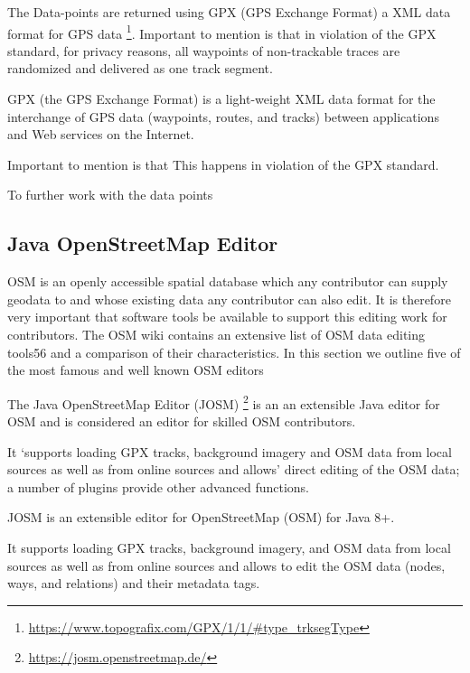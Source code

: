 The Data-points are returned using GPX (GPS Exchange Format) a XML data format for GPS data \footnote{\url{https://www.topografix.com/GPX/1/1/#type_trksegType}}. Important to mention is that in violation of the GPX standard, for privacy reasons, all waypoints of non-trackable traces are randomized and delivered as one track segment. 

GPX (the GPS Exchange Format) is a light-weight XML data format for the interchange of GPS data (waypoints, routes, and tracks) between applications and Web services on the Internet. 

Important to mention is that This happens in violation of the GPX standard. 

To further work with the data points 




\subsection{Java OpenStreetMap Editor}

OSM is an openly accessible spatial database which any contributor can supply geodata to and whose existing data any contributor can also edit. It is therefore very important that software tools be available to support this editing work for contributors. The OSM wiki contains an extensive list of OSM data editing tools56
and a comparison of their characteristics. In this section we outline five of the most famous and well known OSM editors

The Java OpenStreetMap Editor (JOSM) \footnote{\url{https://josm.openstreetmap.de/}} is an an extensible Java editor for OSM and is considered an editor for skilled OSM contributors. 

It ‘supports loading GPX tracks, background imagery and OSM data from local sources as well as from online sources and allows’ direct editing of the OSM data; a number of plugins provide other advanced functions. 

JOSM is an extensible editor for ​OpenStreetMap (OSM) for ​Java 8+.

 It supports loading GPX tracks, background imagery, and OSM data from local sources as well as from online sources and allows to edit the OSM data (nodes, ways, and relations) and their metadata tags. 
 

